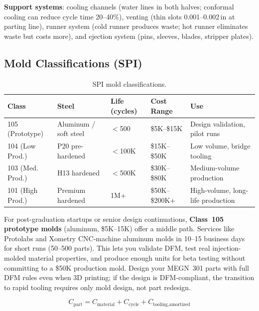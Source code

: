 \documentclass[11pt,letterpaper,twoside,openany]{book}
\begin{document}
\textbf{Support systems}: cooling channels (water lines in both halves; conformal cooling can reduce cycle time 20--40\%), venting (thin slots 0.001--0.002\,in at parting line), runner system (cold runner produces waste; hot runner eliminates waste but costs more), and ejection system (pins, sleeves, blades, stripper plates).

\subsection{Mold Classifications (SPI)}

\begin{table}[htbp]
\centering\small
\begin{tabularx}{\textwidth}{l l l l X}
  \toprule
  \textbf{Class} & \textbf{Steel} & \textbf{Life (cycles)} & \textbf{Cost Range} & \textbf{Use} \\
  \midrule
  105 (Prototype) & Aluminum / soft steel & $<$500 & \$5K--\$15K & Design validation, pilot runs \\
  104 (Low Prod.) & P20 pre-hardened & $<$100K & \$15K--\$50K & Low volume, bridge tooling \\
  103 (Med. Prod.) & H13 hardened & $<$500K & \$30K--\$80K & Medium-volume production \\
  101 (High Prod.) & Premium hardened & 1M+ & \$50K--\$200K+ & High-volume, long-life production \\
  \bottomrule
\end{tabularx}
\caption{SPI mold classifications.}
\end{table}

\begin{tipbox}
For post-graduation startups or senior design continuations, \textbf{Class~105 prototype molds} (aluminum, \$5K--15K) offer a middle path. Services like Protolabs and Xometry CNC-machine aluminum molds in 10--15 business days for short runs (50--500 parts). This lets you validate DFM, test real injection-molded material properties, and produce enough units for beta testing without committing to a \$50K production mold. Design your MEGN~301 parts with full DFM rules even when 3D printing; if the design is DFM-compliant, the transition to rapid tooling requires only mold design, not part redesign.
\end{tipbox}

\begin{equation}
  C_{\text{part}} = C_{\text{material}} + C_{\text{cycle}} + C_{\text{tooling,amortized}}
\end{equation}
\end{document}
